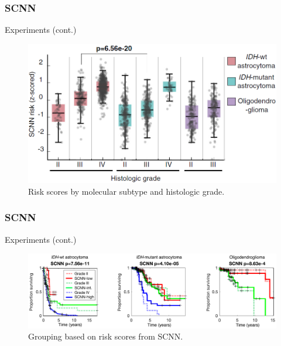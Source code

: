 \documentclass{beamer}
\begin{document}
	\begin{frame}
		\frametitle{SCNN}
		Experiments (cont.)
		
		\begin{figure}[H]
			\centering
			\includegraphics[scale=0.38]{figures/c-index-by-type.png}
			\caption{Risk scores by molecular subtype and histologic grade.}
			\label{fig:ctype}
		\end{figure}
	\end{frame}

	\begin{frame}
		\frametitle{SCNN}
		Experiments (cont.)
		
		\begin{figure}[H]
			\centering
			\includegraphics[scale=0.24]{figures/km-curve.png}
			\caption{Grouping based on risk scores from SCNN.}
			\label{fig:km-curve}
		\end{figure}
	\end{frame}
\end{document}
